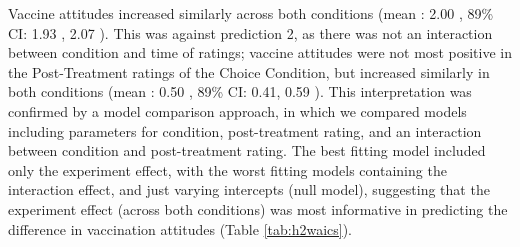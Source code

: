 \documentclass[
  english,
  ,jou,floatsintext]{apa6}
\begin{document}
Vaccine attitudes increased similarly across both conditions (mean : 2.00 , 89\% CI: 1.93 , 2.07 ). This was against prediction 2, as there was not an interaction between condition and time of ratings; vaccine attitudes were not most positive in the Post-Treatment ratings of the Choice Condition, but increased similarly in both conditions (mean : 0.50 , 89\% CI: 0.41, 0.59 ). This interpretation was confirmed by a model comparison approach, in which we compared models including parameters for condition, post-treatment rating, and an interaction between condition and post-treatment rating. The best fitting model included only the experiment effect, with the worst fitting models containing the interaction effect, and just varying intercepts (null model), suggesting that the experiment effect (across both conditions) was most informative in predicting the difference in vaccination attitudes (Table \ref{tab:h2waics}).
\end{document}
